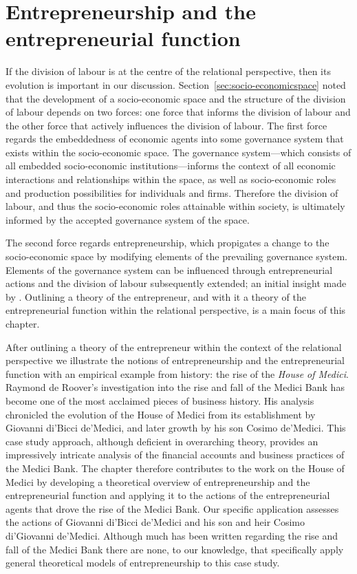 \chapter{Entrepreneurship and the entrepreneurial function} 
\label{ch:entrepreneurship}

If the division of labour is at the centre of the relational perspective, then its evolution is important in our discussion. Section~\ref{sec:socio-economicspace} noted that the development of a socio-economic space and the structure of the division of labour depends on two forces: one force that informs the division of labour and the other force that actively influences the division of labour. The first force regards the embeddedness of economic agents into some governance system that exists within the socio-economic space. The governance system---which consists of all embedded socio-economic institutions---informs the context of all economic interactions and relationships within the space, as well as socio-economic roles and production possibilities for individuals and firms. Therefore the division of labour, and thus the socio-economic roles attainable within society, is ultimately informed by the accepted governance system of the space. 

The second force regards entrepreneurship, which propigates a change to the socio-economic space by modifying elements of the prevailing governance system. Elements of the governance system can be influenced through entrepreneurial actions and the division of labour subsequently extended; an initial insight made by \citet{Smith1776}. Outlining a theory of the entrepreneur, and with it a theory of the entrepreneurial function within the relational perspective, is a main focus of this chapter.

After outlining a theory of the entrepreneur within the context of the relational perspective we illustrate the notions of entrepreneurship and the entrepreneurial function with an empirical example from history: the rise of the \emph{House of Medici}. Raymond de Roover's investigation into the rise and fall of the Medici Bank has become one of the most acclaimed pieces of business history. His analysis chronicled the evolution of the House of Medici from its establishment by Giovanni di'Bicci de'Medici, and later growth by his son Cosimo de'Medici. This case study approach, although deficient in overarching theory, provides an impressively intricate analysis of the financial accounts and business practices of the Medici Bank. The chapter therefore contributes to the work on the House of Medici by developing a theoretical overview of entrepreneurship and the entrepreneurial function and applying it to the actions of the entrepreneurial agents that drove the rise of the Medici Bank. Our specific application assesses the actions of Giovanni di'Bicci de'Medici and his son and heir Cosimo di'Giovanni de'Medici. Although much has been written regarding the rise and fall of the Medici Bank there are none, to our knowledge, that specifically apply general theoretical models of entrepreneurship to this case study.

